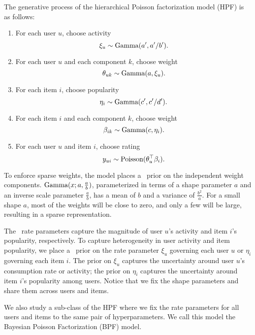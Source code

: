 The generative process of the hierarchical Poisson factorization model
(HPF) is as follows:
\begin{enumerate}
\item For each user $u$, choose activity
  \begin{equation*}
    \xi_u \sim \textrm{Gamma}(a', a'/b').
  \end{equation*}
\item For each user $u$ and each component $k$, choose weight
  \begin{equation*}
    \theta_{uk} \sim \textrm{Gamma}(a, \xi_u).
  \end{equation*}
\item For each item $i$, choose popularity
  \begin{equation*}
    \eta_i \sim \textrm{Gamma}(c', c'/d').
  \end{equation*}
\item For each item $i$ and each component $k$, choose weight
  \begin{equation*}
    \beta_{ik} \sim \textrm{Gamma}(c, \eta_i).
  \end{equation*}
\item For each user $u$ and item $i$, choose rating
  \begin{equation*}
    y_{ui} \sim \textrm{Poisson}(\theta_u^\top \beta_i).
  \end{equation*}
\end{enumerate}
To enforce sparse weights, the model places a \gam~prior on the
independent weight components. $\textrm{Gamma}(x;a,\frac{a}{b})$, parameterized
in terms of a shape parameter $a$ and an inverse scale parameter
$\frac{a}{b}$, has a mean of $b$ and a variance of
$\frac{b^2}{a}$. For a small shape $a$, most of the weights will be
close to zero, and only a few will be large, resulting in a sparse
representation.

The \gam~rate parameters capture the magnitude of user $u$'s activity
and item $i$'s popularity, respectively.  To capture heterogeneity in
user activity and item popularity, we place a \gam~prior on the rate
parameter $\xi_u$ governing each user $u$ or $\eta_i$ governing each
item $i$. The prior on $\xi_u$ captures the uncertainty around user
$u$'s consumption rate or activity; the prior on $\eta_i$ captures the
uncertainty around item $i$'s popularity among users. Notice that we
fix the shape parameters and share them across users and items.


We also study a sub-class of the HPF where we fix the rate parameters
for all users and items to the same pair of hyperparameters. We call
this model the Bayesian Poisson Factorization (BPF) model.

